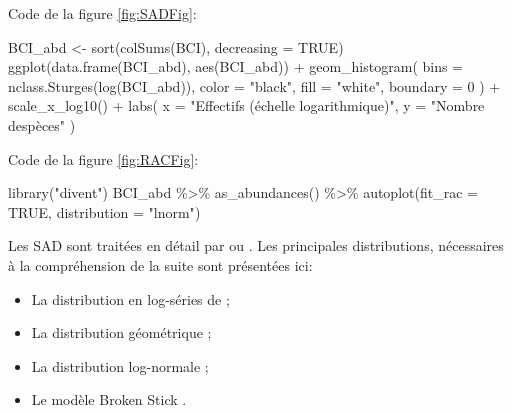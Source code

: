 \documentclass[
  11pt,
  american,
  a4paper,
  extrafontsizes,onecolumn,openright
  ]{memoir}
\newenvironment{Shaded}{\begin{snugshade}}{\end{snugshade}}
\newcommand{\AttributeTok}[1]{\textcolor[rgb]{0.77,0.63,0.00}{#1}}
\newcommand{\ConstantTok}[1]{\textcolor[rgb]{0.00,0.00,0.00}{#1}}
\newcommand{\DecValTok}[1]{\textcolor[rgb]{0.00,0.00,0.81}{#1}}
\newcommand{\FunctionTok}[1]{\textcolor[rgb]{0.00,0.00,0.00}{#1}}
\newcommand{\NormalTok}[1]{#1}
\newcommand{\OtherTok}[1]{\textcolor[rgb]{0.56,0.35,0.01}{#1}}
\newcommand{\SpecialCharTok}[1]{\textcolor[rgb]{0.00,0.00,0.00}{#1}}
\newcommand{\StringTok}[1]{\textcolor[rgb]{0.31,0.60,0.02}{#1}}
\providecommand{\tightlist}{%
  \setlength{\itemsep}{0pt}\setlength{\parskip}{0pt}}
\begin{document}
\normalsize

Code de la figure \ref{fig:SADFig}:

\scriptsize

\begin{Shaded}
\begin{Highlighting}[]
\NormalTok{BCI\_abd }\OtherTok{\textless{}{-}} \FunctionTok{sort}\NormalTok{(}\FunctionTok{colSums}\NormalTok{(BCI), }\AttributeTok{decreasing =} \ConstantTok{TRUE}\NormalTok{)}
\FunctionTok{ggplot}\NormalTok{(}\FunctionTok{data.frame}\NormalTok{(BCI\_abd), }\FunctionTok{aes}\NormalTok{(BCI\_abd)) }\SpecialCharTok{+} 
  \FunctionTok{geom\_histogram}\NormalTok{(}
    \AttributeTok{bins =} \FunctionTok{nclass.Sturges}\NormalTok{(}\FunctionTok{log}\NormalTok{(BCI\_abd)), }
    \AttributeTok{color =} \StringTok{"black"}\NormalTok{, }
    \AttributeTok{fill =} \StringTok{"white"}\NormalTok{,}
    \AttributeTok{boundary =} \DecValTok{0}
\NormalTok{  ) }\SpecialCharTok{+}
  \FunctionTok{scale\_x\_log10}\NormalTok{() }\SpecialCharTok{+}
  \FunctionTok{labs}\NormalTok{(}
    \AttributeTok{x =} \StringTok{"Effectifs (échelle logarithmique)"}\NormalTok{, }
    \AttributeTok{y =} \StringTok{"Nombre d\textquotesingle{}espèces"}
\NormalTok{  )}
\end{Highlighting}
\end{Shaded}

\normalsize

Code de la figure \ref{fig:RACFig}:

\scriptsize

\begin{Shaded}
\begin{Highlighting}[]
\FunctionTok{library}\NormalTok{(}\StringTok{"divent"}\NormalTok{)}
\NormalTok{BCI\_abd }\SpecialCharTok{\%\textgreater{}\%} 
  \FunctionTok{as\_abundances}\NormalTok{() }\SpecialCharTok{\%\textgreater{}\%} 
  \FunctionTok{autoplot}\NormalTok{(}\AttributeTok{fit\_rac =} \ConstantTok{TRUE}\NormalTok{, }\AttributeTok{distribution =} \StringTok{"lnorm"}\NormalTok{)}
\end{Highlighting}
\end{Shaded}

\normalsize

Les SAD sont traitées en détail par \textcite{Magurran1988} ou \textcite{McGill2007}.
Les principales distributions, nécessaires à la compréhension de la suite sont présentées ici:

\begin{itemize}
\tightlist
\item
  La distribution en log-séries de \textcite{Fisher1943};
\item
  La distribution géométrique \autocite{Motomura1932,Whittaker1972};
\item
  La distribution log-normale \autocite{Preston1948};
\item
  Le modèle Broken Stick \autocite{MacArthur1957}.
\end{itemize}
\end{document}
